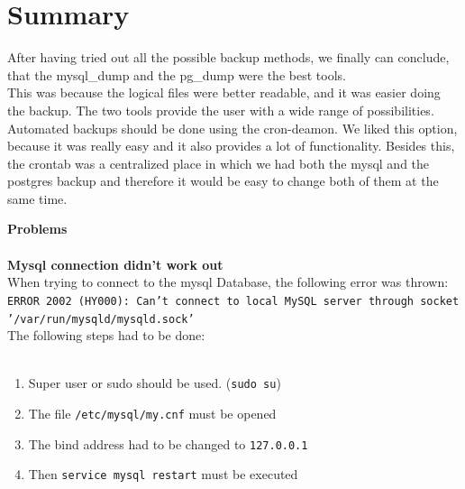 \documentclass[10pt]{article}
\begin{document}
\section{Summary}
After having tried out all the possible backup methods, we finally can conclude, that the mysql\_dump and the pg\_dump were the best tools. \\ 
This was because the logical files were better readable, and it was easier doing the backup. The two tools provide the user with a wide range of possibilities. \\
Automated backups should be done using the cron-deamon. We liked this option, because it was really easy and it also provides a lot of functionality. Besides this, the crontab was a centralized place in which we had both the mysql and the postgres backup and therefore it would be easy to change both of them at the same time.

\newpage
\textbf{Problems} \\ \\
\textbf{Mysql connection didn't work out} \\
When trying to connect to the mysql Database, the following error was thrown:
\texttt{ERROR 2002 (HY000): Can't connect to local MySQL server through socket '/var/run/mysqld/mysqld.sock'} \\
The following steps had to be done: \\
\\ 
\begin{enumerate}
\item Super user or sudo should be used. (\texttt{sudo su}) 
\item The file \texttt{/etc/mysql/my.cnf} must be opened 
\item The bind address had to be changed to \texttt{127.0.0.1}
\item Then \texttt{service mysql restart} must be executed
\end{enumerate}
\cite{mysqlProblem1}
\end{document}

